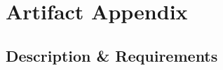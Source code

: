 \documentclass[conference]{IEEEtran}
\begin{document}

\appendices
\section{Artifact Appendix}


 

\subsection{Description \& Requirements}


\end{document}
